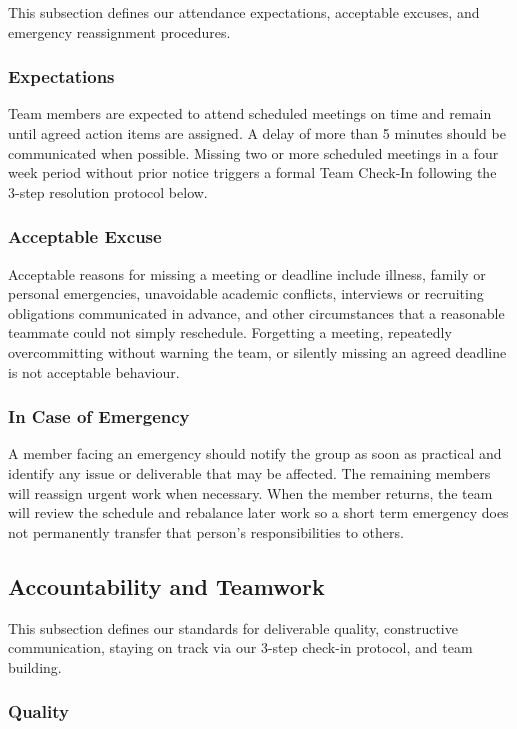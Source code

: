 \documentclass{article}
\begin{document}
This subsection defines our attendance expectations, acceptable excuses, and emergency reassignment procedures.

\subsubsection*{Expectations}

Team members are expected to attend scheduled meetings on time and remain until agreed action items are assigned. A delay of more than 5 minutes should be communicated when possible. Missing two or more scheduled meetings in a four week period without prior notice triggers a formal Team Check-In following the 3-step resolution protocol below.

\subsubsection*{Acceptable Excuse}

Acceptable reasons for missing a meeting or deadline include illness, family or personal emergencies, unavoidable academic conflicts, interviews or recruiting obligations communicated in advance, and other circumstances that a reasonable teammate could not simply reschedule. Forgetting a meeting, repeatedly overcommitting without warning the team, or silently missing an agreed deadline is not acceptable behaviour.

\subsubsection*{In Case of Emergency}

A member facing an emergency should notify the group as soon as practical and identify any issue or deliverable that may be affected. The remaining members will reassign urgent work when necessary. When the member returns, the team will review the schedule and rebalance later work so a short term emergency does not permanently transfer that person's responsibilities to others.

\subsection*{Accountability and Teamwork}

This subsection defines our standards for deliverable quality, constructive communication, staying on track via our 3-step check-in protocol, and team building.

\subsubsection*{Quality}
\end{document}
